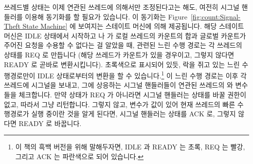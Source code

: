 \begin{lineref}
쓰레드별 상태는 이제 연관된 쓰레드에 의해서만 조정된다고는 해도, 여전히 시그널
핸들러를 이용해 동기화를 할 필요가 있습니다.
이 동기화는 Figure~\ref{fig:count:Signal-Theft State Machine} 에 보여지는
스테이트 머신에 의해 제공됩니다.
해당 스테이트 머신은 IDLE 상태에서 시작하고  나
 가 로컬 쓰레드의 카운트의 합과 글로벌 카운트가 주어진 요청을
수용할 수 없다는 걸 알았을 때, 관련된 느린 수행 경로는 각 쓰레드의 
상태를 REQ 로 만듭니다 (해당 쓰레드가 카운트가 있을 경우이고, 그렇지 않다면
READY 로 곧바로 변환시킵니다).
초록색으로 표시되어 있듯,  락을 쥐고 있는 느린 수행경로만이
IDLE 상태로부터의 변환을 할 수 있습니다.\footnote{
	이 책의 흑백 버전을 위해 말해두자면, IDLE 과 READY 는 초록, REQ 는
	빨강, 그리고 ACK 는 파란색으로 되어 있습니다.}
이 느린 수행 경로는 이후 각 쓰레드에 시그널을 보내고, 그에 상응하는 시그널
핸들러들이 연관된 쓰레드의  와  변수들을 체크합니다.
만약  상태가 REQ 가 아니라면 시그널 핸들러는 상태를 바꿀 권한이 없고,
따라서 그냥 리턴합니다.
그렇지 않고,  변수가 값이 있어 현재 쓰레드의 빠른 수행경로가 실행
중이란 것을 알게 된다면, 시그널 핸들러는  상태를 ACK 로, 그렇지
않다면 READY 로 바꿉니다.

\end{lineref}

